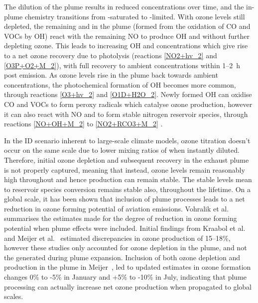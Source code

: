 
The dilution of the plume results in reduced  concentrations over time, and the in-plume chemistry transitions from -saturated to -limited. With ozone levels still depleted, the remaining  and  in the plume (formed from the oxidation of CO and VOCs by OH) react with the remaining NO to produce OH and  without further depleting ozone. This leads to increasing OH and  concentrations which give rise to a net ozone recovery due to  photolysis (reactions \eqref{NO2+hv_2} and \eqref{O3P+O2+M_2}), with full recovery to ambient concentrations within 1--2~h post emission. As ozone levels rise in the plume back towards ambient concentrations, the photochemical formation of OH becomes more common, through reactions \eqref{O3+hv_2} and \eqref{O1D+H2O_2}. Newly formed OH can oxidise CO and VOCs to form peroxy radicals which catalyse ozone production, however it can also react with NO and  to form stable nitrogen reservoir species, through reactions \eqref{NO+OH+M_2} to \eqref{NO2+RCO3+M_2} \cite{Fritz2020}.

In the ID scenario inherent to large-scale climate models, ozone titration doesn't occur on the same scale due to lower mixing ratios of  when instantly diluted. Therefore, initial ozone depletion and subsequent recovery in the exhaust plume is not properly captured, meaning that instead, ozone levels remain reasonably high throughout and hence  production can remain stable. The stable  levels mean  to reservoir species conversion remains stable also, throughout the  lifetime. On a global scale, it has been shown that inclusion of plume processes leads to a net reduction in ozone forming potential of aviation  emissions. Vohralik et al.\ \cite{Vohralik2008} summarises the estimates made for the degree of reduction in ozone forming potential when plume effects were included. Initial findings from Kraabol et al.\ \cite{Kraabol2002} and Meijer et al.\ \cite{Meijer1997} estimated discrepancies in ozone production of 15--18\%, however these studies only accounted for ozone depletion in the plume, and not the  generated during plume expansion. Inclusion of both ozone depletion and production in the plume in Meijer\ \cite{Meijer2001}, led to updated estimates in ozone formation changes 0\% to -5\% in January and +5\% to -10\% in July, indicating that plume processing can actually increase net ozone production when propagated to global scales. %

